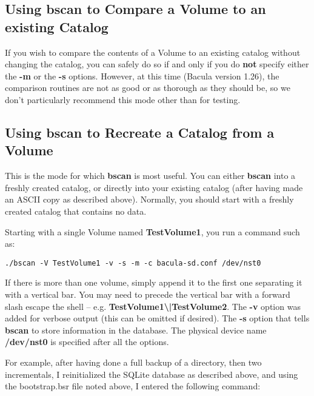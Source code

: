 \subsection{Using bscan to Compare a Volume to an existing Catalog}

If you wish to compare the contents of a Volume to an existing catalog without
changing the catalog, you can safely do so if and only if you do {\bf not}
specify either the {\bf -m} or the {\bf -s} options. However, at this time
(Bacula version 1.26), the comparison routines are not as good or as thorough
as they should be, so we don't particularly recommend this mode other than for
testing.

\subsection{Using bscan to Recreate a Catalog from a Volume}

This is the mode for which {\bf bscan} is most useful. You can either {\bf
bscan} into a freshly created catalog, or directly into your existing catalog
(after having made an ASCII copy as described above). Normally, you should
start with a freshly created catalog that contains no data.

Starting with a single Volume named {\bf TestVolume1}, you run a command such
as:

\footnotesize
\begin{verbatim}
./bscan -V TestVolume1 -v -s -m -c bacula-sd.conf /dev/nst0
\end{verbatim}
\normalsize

If there is more than one volume, simply append it to the first one separating
it with a vertical bar. You may need to precede the vertical bar with a
forward slash escape the shell -- e.g. {\bf
TestVolume1\textbackslash{}|TestVolume2}. The {\bf -v} option was added for
verbose output (this can be omitted if desired). The {\bf -s} option that
tells {\bf bscan} to store information in the database. The physical device
name {\bf /dev/nst0} is specified after all the options.

{\bf} For example, after having done a full backup of a directory, then two
incrementals, I reinitialized the SQLite database as described above, and
using the bootstrap.bsr file noted above, I entered the following command:

